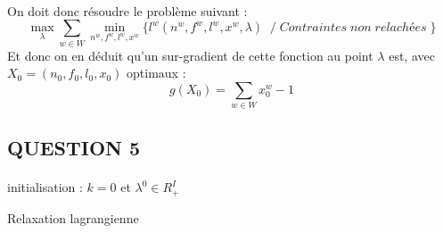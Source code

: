 \documentclass[a4paper, 11pt]{article} %
\begin{document}
\paragraph*{}
On doit donc résoudre le problème suivant :
$$ \max_{\lambda} \sum_{w \in W} \min_{n^w,f^w,l^w,x^w} \{ l^w(n^w,f^w,l^w,x^w,\lambda)  \;\; / \; Contraintes \; non \; relachées \; \} $$
Et donc on en déduit qu'un sur-gradient de cette fonction au point $\lambda$ est, avec $X_0 = (n_0, f_0, l_0, x_0)$ optimaux :
$$ g(X_0) = \sum_{w \in W} x_0^w - 1 $$


\subsection*{QUESTION 5}

\paragraph*{}
\begin{algorithm}[H]
 initialisation : $k = 0$ et $\lambda^0 \in R_{+}^I $ \;
 \caption{Relaxation lagrangienne}
\end{algorithm}
\end{document}
